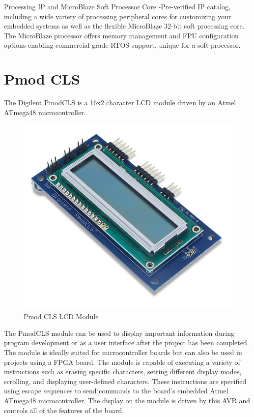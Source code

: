 Processing IP and MicroBlaze Soft Processor Core -Pre-verified IP catalog, including a wide variety of processing peripheral cores for customizing your embedded systems as well as the flexible MicroBlaze 32-bit soft processing core. The MicroBlaze processor offers memory management and FPU configuration options enabling commercial grade RTOS support, unique for a soft processor. \cite{xilinx-xps-edk}

\section{Pmod CLS}
The Digilent PmodCLS is a 16x2 character LCD module driven by an Atmel ATmega48 microcontroller.

\begin{figure}
	\centering
	\includegraphics{images/pmodcls-product.png}
	\caption{Pmod CLS LCD Module}
\end{figure}


The PmodCLS module can be used to display important information during program development or as a user
interface after the project has been completed. The module is ideally suited for microcontroller boards but can
also be used in projects using a FPGA board.
The module is capable of executing a variety of instructions such as erasing specific characters, setting different
display modes, scrolling, and displaying user-defined characters. These instructions are specified using escape
sequences to send commands to the board’s embedded Atmel ATmega48 microcontroller. The display on the
module is driven by this AVR and controls all of the features of the board.

